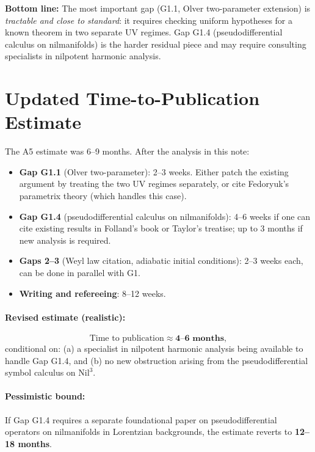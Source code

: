 \documentclass[11pt, a4paper]{article}
\newcommand{\Nil}{\mathrm{Nil}^3}
\begin{document}
\noindent
\textbf{Bottom line:}
The most important gap (G1.1, Olver two-parameter extension) is
\emph{tractable and close to standard}: it requires checking
uniform hypotheses for a known theorem in two separate UV regimes.
Gap G1.4 (pseudodifferential calculus on nilmanifolds) is the harder
residual piece and may require consulting specialists in nilpotent
harmonic analysis.

\section{Updated Time-to-Publication Estimate}

The A5 estimate was 6--9 months. After the analysis in this note:

\begin{itemize}
\item \textbf{Gap G1.1} (Olver two-parameter): 2--3 weeks.
  Either patch the existing argument by treating the two UV regimes
  separately, or cite Fedoryuk's parametrix theory (which handles
  this case).

\item \textbf{Gap G1.4} (pseudodifferential calculus on nilmanifolds):
  4--6 weeks if one can cite existing results in Folland's book or
  Taylor's treatise; up to 3 months if new analysis is required.

\item \textbf{Gaps 2--3} (Weyl law citation, adiabatic initial conditions):
  2--3 weeks each, can be done in parallel with G1.

\item \textbf{Writing and refereeing}: 8--12 weeks.
\end{itemize}

\paragraph{Revised estimate (realistic):}
\begin{equation*}
  \text{Time to publication} \approx \mathbf{4\text{--}6 \text{ months}},
\end{equation*}
conditional on:
(a) a specialist in nilpotent harmonic analysis being available to
handle Gap G1.4, and
(b) no new obstruction arising from the pseudodifferential
symbol calculus on $\Nil$.

\paragraph{Pessimistic bound:}
If Gap G1.4 requires a separate foundational paper on
pseudodifferential operators on nilmanifolds in Lorentzian
backgrounds, the estimate reverts to \textbf{12--18 months}.
\end{document}
